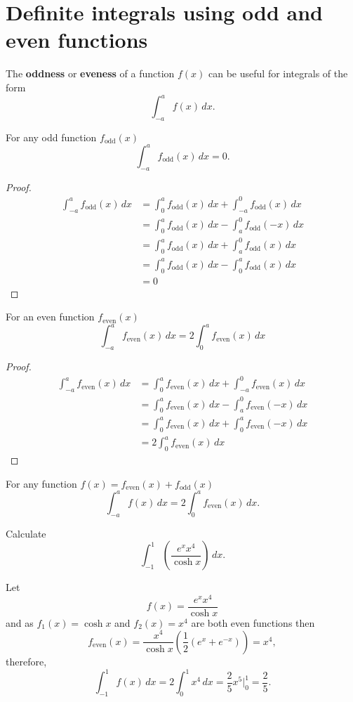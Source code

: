 \section{Definite integrals using odd and even functions}

The \textbf{oddness} or \textbf{eveness} of a function $f(x)$ can be useful for integrals of the form \[\int^a_{-a}f(x)\,dx.\]

\begin{theorem}
    For any odd function $f_{\text{odd}}(x)$ \[ \int^{a}_{-a} f_{\text{odd}}(x) \, dx = 0. \]
\end{theorem}

\begin{proof}
    \begin{align*}
        \int^{a}_{-a} f_{\text{odd}}(x) \, dx &= \int^{a}_{0} f_{\text{odd}}(x) \, dx + \int^{0}_{-a} f_{\text{odd}}(x) \, dx \\
        &=\int^{a}_{0}f_{\text{odd}}(x)\,dx-\int^{0}_{a}f_{\text{odd}}(-x)\,dx\\
        &=\int^{a}_{0}f_{\text{odd}}(x)\,dx+\int^{0}_{a}f_{\text{odd}}(x)\,dx\\
        &=\int^{a}_{0}f_{\text{odd}}(x)\,dx-\int^{a}_{0}f_{\text{odd}}(x)\,dx\\
        &=0
    \end{align*}
\end{proof}

\begin{theorem}
    For an even function $f_{\text{even}}(x)$ \[\int^a_{-a}f_{\text{even}}(x)\,dx=2\int^a_0f_{\text{even}}(x)\,dx\]
\end{theorem}

\begin{proof}
    \begin{align*}
        \int^a_{-a}f_{\text{even}}(x)\,dx&=\int^a_0f_{\text{even}}(x)\,dx+\int^0_{-a}f_{\text{even}}(x)\,dx\\
        &=\int^a_0f_{\text{even}}(x)\,dx-\int^0_{a}f_{\text{even}}(-x)\,dx\\
        &=\int^a_0f_{\text{even}}(x)\,dx+\int^a_0f_{\text{even}}(-x)\,dx\\
        &=2\int^a_0f_{\text{even}}(x)\,dx
    \end{align*}
\end{proof}

\begin{theorem}
    For any function $f(x)=f_{\text{even}}(x)+f_{\text{odd}}(x)$ \[\int^a_{-a}f(x)\,dx=2\int^a_0f_{\text{even}}(x)\,dx.\]
\end{theorem}

\begin{example}
    Calculate \[\int_{-1}^1\left(\dfrac{e^xx^4}{\cosh{x}}\right)\,dx.\]
    
    Let \[f(x)=\dfrac{e^xx^4}{\cosh{x}}\] and as $f_1(x)=\cosh{x}$ and $f_2(x)=x^4$ are both even functions then \[f_{\text{even}}(x)=\dfrac{x^4}{\cosh{x}}\left(\frac12(e^x+e^{-x})\right)=x^4,\] therefore, \[\int^1_{-1}f(x)\,dx=2\int^1_0x^4\,dx=\frac25x^5\Big|^1_0=\frac25.\]
\end{example}
